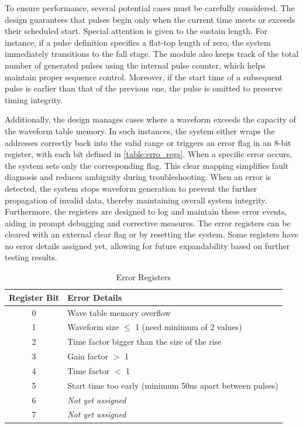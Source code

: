 To ensure performance, several potential cases must be carefully considered. The design guarantees that pulses begin only when the current time meets or exceeds their scheduled start. Special attention is given to the sustain length. For instance, if a pulse definition specifies a flat-top length of zero, the system immediately transitions to the fall stage. The module also keeps track of the total number of generated pulses using the internal pulse counter, which helps maintain proper sequence control. Moreover, if the start time of a subsequent pulse is earlier than that of the previous one, the pulse is omitted to preserve timing integrity.

Additionally, the design manages cases where a waveform exceeds the capacity of the waveform table memory. In such instances, the system either wraps the addresses correctly back into the valid range or triggers an error flag in an 8-bit register, with each bit defined in \autoref{table:erro_regs}. 
When a specific error occurs, the system sets only the corresponding flag. This clear mapping simplifies fault diagnosis and reduces ambiguity during troubleshooting. When an error is detected, the system stops waveform generation to prevent the further propagation of invalid data, thereby maintaining overall system integrity. Furthermore, the registers are designed to log and maintain these error events, aiding in prompt debugging and corrective measures. The error registers can be cleared with an external clear flag or by resetting the system. Some registers have no error details assigned yet, allowing for future expandability based on further testing results.
\begin{table}[h]
\setlength{\abovecaptionskip}{5pt}    %
\setlength{\belowcaptionskip}{5pt}    %
\centering
\caption{Error Registers}
\label{table:erro_regs}
\begin{tabular}{|c|l|}
\hline
Register Bit & Error Details \\
\hline
0 & Wave table memory overflow \\
\hline
1 & Waveform size $\leq$ 1 (need minimum of 2 values) \\
\hline
2 & Time factor bigger than the size of the rise \\
\hline
3 & Gain factor $>$ 1 \\
\hline
4 & Time factor $<$ 1 \\
\hline
5 & Start time too early (minimum 50ns apart between pulses) \\
\hline
6 & \textit{Not yet assigned} \\
\hline
7 & \textit{Not yet assigned} \\
\hline
\end{tabular}
\end{table}